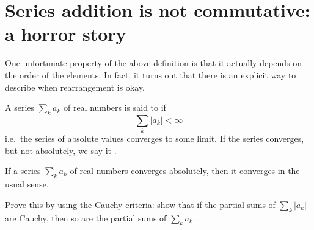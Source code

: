 \section{Series addition is not commutative: a horror story}
One unfortunate property of the above definition
is that it actually depends on the order of the elements.
In fact, it turns out that there is an explicit way
to describe when rearrangement is okay.

\begin{definition}
	A series $\sum_k a_k$ of real numbers
	is said to  if
	\[ \sum_k \left\lvert a_k \right\rvert < \infty \]
	i.e.\ the series of absolute values converges to some limit.
	If the series converges, but not absolutely,
	we say it .
\end{definition}

\begin{proposition}
	If a series $\sum_k a_k$ of real numbers
	converges absolutely, then it converges in the usual sense.
\end{proposition}
\begin{exercise}
	Prove this by using the Cauchy criteria:
	show that if the partial sums of $\sum_k |a_k|$ are Cauchy,
	then so are the partial sums of $\sum_k a_k$.
\end{exercise}

